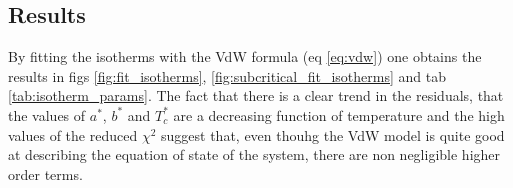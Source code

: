 \documentclass[a4paper, 11pt]{article}
\begin{document}
  \subsection{Results}
    By fitting the isotherms with the VdW formula (eq \ref{eq:vdw}) one obtains the results in figs \ref{fig:fit_isotherms}, \ref{fig:subcritical_fit_isotherms} and tab \ref{tab:isotherm_params}.
    The fact that there is a clear trend in the residuals, that the values of $a^*$, $b^*$ and $T_c^*$ are a decreasing function of temperature and the  high values of the reduced $\chi^2$ suggest that, even thouhg the VdW model is quite good at describing the equation of state of the system, there are non negligible higher order terms. 
\end{document}
